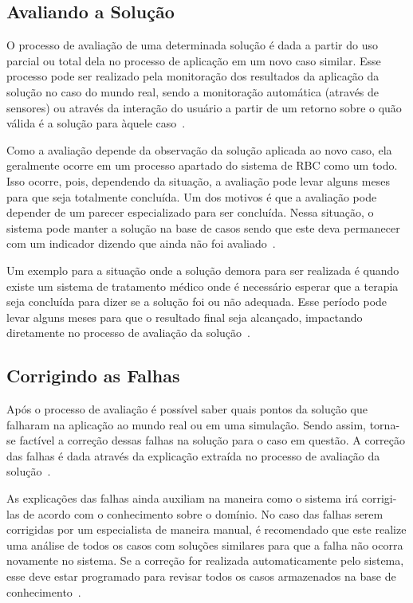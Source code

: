 \subsection{Avaliando a Solução}
\label{sec:avaliandosolucao}

O processo de avaliação de uma determinada solução é dada a partir do uso parcial ou total dela no processo de aplicação em um novo caso similar. Esse processo pode ser realizado pela monitoração dos resultados da aplicação da solução no caso do mundo real, sendo a monitoração automática (através de sensores) ou através da interação do usuário a partir de um retorno sobre o quão válida é a solução para àquele caso~\cite{Gresse:2003}.

Como a avaliação depende da observação da solução aplicada ao novo caso, ela geralmente ocorre em um processo apartado do sistema de RBC como um todo. Isso ocorre, pois, dependendo da situação, a avaliação pode levar alguns meses para que seja totalmente concluída. Um dos motivos é que a avaliação pode depender de um parecer especializado para ser concluída. Nessa situação, o sistema pode manter a solução na base de casos sendo que este deva permanecer com um indicador dizendo que ainda não foi avaliado~\cite{Gresse:2003}.

Um exemplo para a situação onde a solução demora para ser realizada é quando existe um sistema de tratamento médico onde é necessário esperar que a terapia seja concluída para dizer se a solução foi ou não adequada. Esse período pode levar alguns meses para que o resultado final seja alcançado, impactando diretamente no processo de avaliação da solução~\cite{Gresse:2003}.

\subsection{Corrigindo as Falhas}
\label{sec:corrigindofalhas}

Após o processo de avaliação é possível saber quais pontos da solução que falharam na aplicação ao mundo real ou em uma simulação. Sendo assim, torna-se factível a correção dessas falhas na solução para o caso em questão. A correção das falhas é dada através da explicação extraída no processo de avaliação da solução~\cite{Gresse:2003}.

As explicações das falhas ainda auxiliam na maneira como o sistema irá corrigi-las de acordo com o conhecimento sobre o domínio. No caso das falhas serem corrigidas por um especialista de maneira manual, é recomendado que este realize uma análise de todos os casos com soluções similares para que a falha não ocorra novamente no sistema. Se a correção for realizada automaticamente pelo sistema, esse deve estar programado para revisar todos os casos armazenados na base de conhecimento~\cite{Gresse:2003}.

